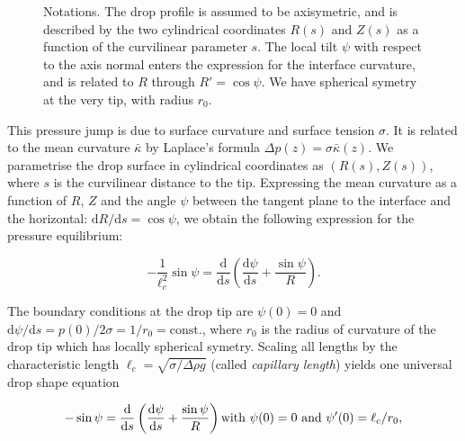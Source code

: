 \documentclass[fleqn]{scrartcl}
\newcommand{\ud}{\mathrm{d}}%
\newcommand{\grid}[2]{%
  \draw[step=0.1cm,gray,ultra thin] (-#1,-#2) grid (#1,#2);%
  \draw[step=0.5cm,gray,thin] (-#1,-#2) grid (#1,#2);%
  \draw[thick] (-#1,0) -- (#1,0);
  \draw[thick] (0,-#2) -- (0,#2);
}
\begin{document}
\begin{figure}
  \begin{captionbeside}{Notations. The drop profile is assumed to be
      axisymetric, and is described by the two cylindrical coordinates
      $R(s)$ and $Z(s)$ as a function of the curvilinear parameter
      $s$. The local tilt $\psi$ with respect to the axis normal
      enters the expression for the interface curvature, and is
      related to $R$ through $R' = \cos\psi$. We have spherical
      symetry at the very tip, with radius $r_0$.}
\end{captionbeside}
\label{fig:notations}
\end{figure}

This pressure jump is due to surface curvature and surface tension
$\sigma$. It is related to the mean curvature $\bar\kappa$ by Laplace's
formula $\Delta\! p(z) = \sigma \bar\kappa(z)$.  We parametrise the drop
surface in cylindrical coordinates as $(R(s), Z(s))$, where $s$ is the
curvilinear distance to the tip. Expressing the mean curvature as a
function of $R$, $Z$ and the angle $\psi$ between the tangent plane to
the interface and the horizontal: $\ud R/\ud s = \cos\psi$, we obtain
the following expression for the pressure equilibrium:

\[\label{eq:shape}
  - \frac{1}{\ell_c^2} \sin\psi =
  \frac{\ud}{\ud s}\left( \frac{\ud\psi}{\ud s} + \frac{\sin\psi}{R} \right).
\]

 The boundary conditions at the drop tip are $\psi(0)=0$ and $\ud\psi
/ \ud s = p(0)/2\sigma = 1/r_0 = \mathrm{const.}$, where $r_0$ is the
radius of curvature of the drop tip which has locally spherical
symetry. Scaling all lengths by the characteristic length $\ell_c =
\sqrt{\sigma/\Delta\!\rho g}$ (called \emph{capillary length}) yields
one universal drop shape equation

\begin{equation}\label{eq:shapeNonDim}
  - \sin\psi =
  \frac{\ud}{\ud s}\left( \frac{\ud\psi}{\ud s} + \frac{\sin\psi}{R} \right)\\
  \mbox{with } \psi(0)=0 \mbox{ and } \psi'(0) = \ell_c/r_0,
\end{equation}
\end{document}
